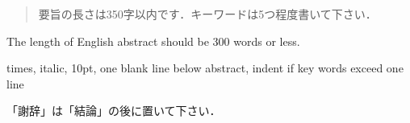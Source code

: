 \documentclass{jjsce}
\begin{document}

\begin{abstract}
  要旨の長さは350字以内です．キーワードは5つ程度書いて下さい．
\end{abstract}
\begin{Eabstract}
  The length of English abstract should be 300 words or less.
\end{Eabstract}
\begin{keyword}
  times, italic, 10pt, one blank line below abstract, indent if key words exceed one line
\end{keyword}

\maketitle



\Acknowledgment
「謝辞」は「結論」の後に置いて下さい．



\end{document}
